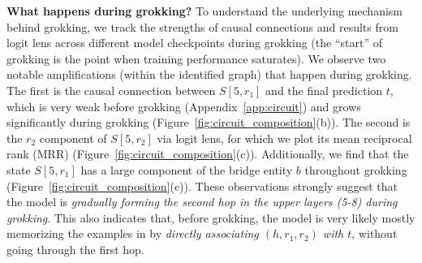 \noindent\textbf{What happens during grokking?} To understand the underlying mechanism behind grokking, we track the strengths of causal connections and results from logit lens across different model checkpoints during grokking (the ``start'' of grokking is the point when training performance saturates). We observe two notable amplifications (within the identified graph) that happen during grokking. The first is the causal connection between $S[5,r_1]$ and the final prediction $t$, which is very weak before grokking (Appendix~\ref{app:circuit}) and grows significantly during grokking (Figure~\ref{fig:circuit_composition}(b)). The second is the $r_2$ component of $S[5,r_2]$ via logit lens, for which we plot its mean reciprocal rank (MRR) (Figure~\ref{fig:circuit_composition}(c)). Additionally, we find that the state $S[5,r_1]$ has a large component of the bridge entity $b$ throughout grokking (Figure~\ref{fig:circuit_composition}(c)). These observations strongly suggest that the model is \textit{gradually forming the second hop in the upper layers (\num{5}-\num{8}) during grokking}.
This also indicates that, before grokking, the model is very likely mostly memorizing the examples in  by \textit{directly associating $(h,r_1,r_2)$ with $t$}, without going through the first hop.

